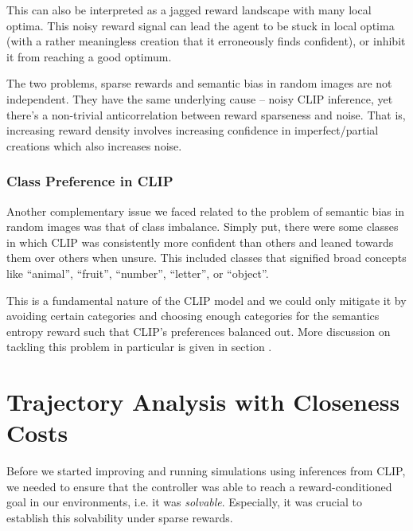 This can also be interpreted as a jagged reward landscape with many local optima.
This noisy reward signal can lead the agent to be stuck in local optima (with a rather meaningless creation that it erroneously finds confident), or inhibit it from reaching a good optimum.

The two problems, sparse rewards and semantic bias in random images are not independent.
They have the same underlying cause -- noisy CLIP inference, yet there's a non-trivial anticorrelation between reward sparseness and noise.
That is, increasing reward density involves increasing confidence in imperfect/partial creations which also increases noise.


\subsubsection{Class Preference in CLIP}
\label{sec:class-preference}
Another complementary issue we faced related to the problem of semantic bias in random images was that of class imbalance.
Simply put, there were some classes in which CLIP was consistently more confident than others and leaned towards them over others when unsure.
This included classes that signified broad concepts like ``animal'', ``fruit'', ``number'', ``letter'', or ``object''.


This is a fundamental nature of the CLIP model and we could only mitigate it by avoiding certain categories and choosing enough categories for the semantics entropy reward such that CLIP's preferences balanced out.
More discussion on tackling this problem in particular is given in section .

\newpage
\section{Trajectory Analysis with Closeness Costs}
\label{sec:closeness-rollouts}
Before we started improving and running simulations using inferences from CLIP, we needed to ensure that the controller was able to reach a reward-conditioned goal in our environments, i.e. it was \emph{solvable}.
Especially, it was crucial to establish this solvability under sparse rewards.

